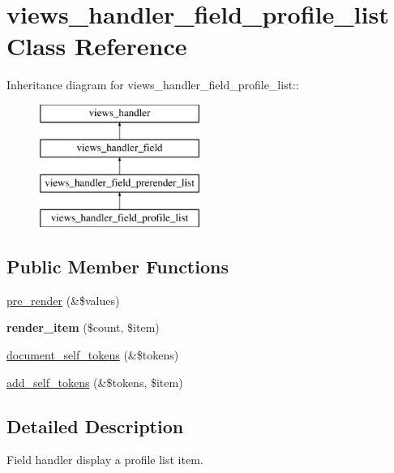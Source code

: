 \hypertarget{classviews__handler__field__profile__list}{
\section{views\_\-handler\_\-field\_\-profile\_\-list Class Reference}
\label{classviews__handler__field__profile__list}
}
Inheritance diagram for views\_\-handler\_\-field\_\-profile\_\-list::\begin{figure}[H]
\begin{center}
\leavevmode
\includegraphics[height=4cm]{classviews__handler__field__profile__list}
\end{center}
\end{figure}
\subsection*{Public Member Functions}
\begin{DoxyCompactItemize}
\item 
\hyperlink{classviews__handler__field__profile__list_a18beb938eb1e7839c96ed6d6e6600418}{pre\_\-render} (\&\$values)
\item 
\hypertarget{classviews__handler__field__profile__list_a8099ba4762d6497c288efe46d804030b}{
{\bfseries render\_\-item} (\$count, \$item)}
\label{classviews__handler__field__profile__list_a8099ba4762d6497c288efe46d804030b}

\item 
\hyperlink{classviews__handler__field__profile__list_ab3950ce980ce3c8e8ce274a25b4e3351}{document\_\-self\_\-tokens} (\&\$tokens)
\item 
\hyperlink{classviews__handler__field__profile__list_a411c5238debac02e7cb3f582f7cd8e9f}{add\_\-self\_\-tokens} (\&\$tokens, \$item)
\end{DoxyCompactItemize}


\subsection{Detailed Description}
Field handler display a profile list item. 

